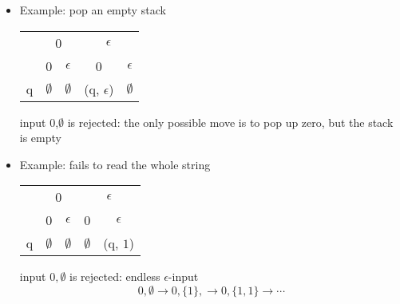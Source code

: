 \begin{frame}[allowframebreaks]
\begin{itemize}
\item Example: pop an empty stack

  \begin{center}
  \begin{tabular}{c|cccc}
    & \multicolumn{2}{c}{0} & \multicolumn{2}{c}{$\epsilon$}\\
& 0 & $\epsilon$ & 0 & $\epsilon$ \\ \hline
q & $\emptyset$ & $\emptyset$ & (q, $\epsilon$) & $\emptyset$
  \end{tabular}
\end{center}

input 0,$\emptyset$ is rejected: the only possible move is to pop up
zero, but the stack is empty

\item Example: fails to read the whole string

  \begin{center}
  \begin{tabular}{c|cccc}
    & \multicolumn{2}{c}{0} & \multicolumn{2}{c}{$\epsilon$}\\
& 0 & $\epsilon$ & 0 & $\epsilon$
\\ \hline
q & $\emptyset$ & $\emptyset$ & $\emptyset$& (q, $1$)
  \end{tabular}
\end{center}
input $0,\emptyset$ is rejected: endless $\epsilon$-input
\begin{equation*}
  0,\emptyset \rightarrow 0, \{1\}, \rightarrow 0, \{1, 1\}
  \rightarrow \cdots
\end{equation*}
\end{itemize}\end{frame}


